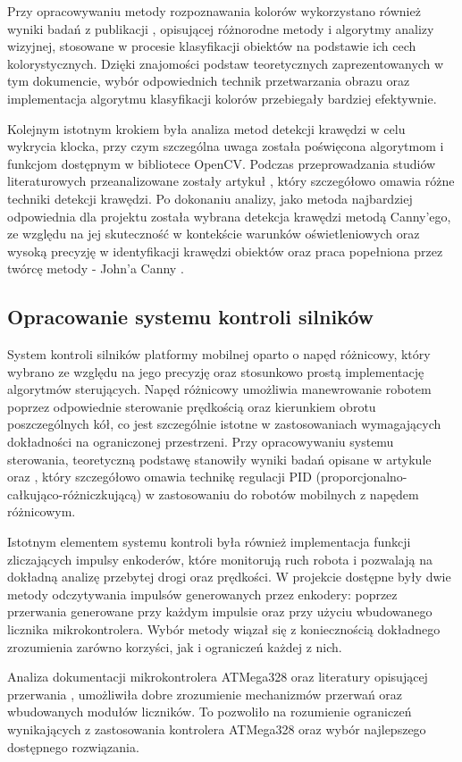 Przy opracowywaniu metody rozpoznawania kolorów wykorzystano również wyniki badań z publikacji \cite{bib:artykul2}, opisującej różnorodne metody i algorytmy analizy wizyjnej, stosowane w procesie klasyfikacji obiektów na podstawie ich cech kolorystycznych. Dzięki znajomości podstaw teoretycznych zaprezentowanych w tym dokumencie, wybór odpowiednich technik przetwarzania obrazu oraz implementacja algorytmu klasyfikacji kolorów przebiegały bardziej efektywnie.

Kolejnym istotnym krokiem była analiza metod detekcji krawędzi w celu wykrycia klocka, przy czym szczególna uwaga została poświęcona algorytmom i funkcjom dostępnym w bibliotece OpenCV. Podczas przeprowadzania studiów literaturowych przeanalizowane zostały artykuł \cite{bib:artykul}, który szczegółowo omawia różne techniki detekcji krawędzi. Po dokonaniu analizy, jako metoda najbardziej odpowiednia dla projektu została wybrana detekcja krawędzi metodą Canny’ego, ze względu na jej skuteczność w kontekście warunków oświetleniowych oraz wysoką precyzję w identyfikacji krawędzi obiektów oraz praca popełniona przez twórcę metody - John'a Canny \cite{bib:canny-article}.


\subsection{Opracowanie systemu kontroli silników}
\label{sec:opracowanie-silnik}
System kontroli silników platformy mobilnej oparto o napęd różnicowy, który wybrano ze względu na jego precyzję oraz stosunkowo prostą implementację algorytmów sterujących. Napęd różnicowy umożliwia manewrowanie robotem poprzez odpowiednie sterowanie prędkością oraz kierunkiem obrotu poszczególnych kół, co jest szczególnie istotne w zastosowaniach wymagających dokładności na ograniczonej przestrzeni. Przy opracowywaniu systemu sterowania, teoretyczną podstawę stanowiły wyniki badań opisane w artykule \cite{bib:konferencja} oraz \cite{bib:encoders-pid}, który szczegółowo omawia technikę regulacji PID (proporcjonalno-całkująco-różniczkującą) w zastosowaniu do robotów mobilnych z napędem różnicowym. 

Istotnym elementem systemu kontroli była również implementacja funkcji zliczających impulsy enkoderów, które monitorują ruch robota i pozwalają na dokładną analizę przebytej drogi oraz prędkości. W projekcie dostępne były dwie metody odczytywania impulsów generowanych przez enkodery: poprzez przerwania generowane przy każdym impulsie oraz przy użyciu wbudowanego licznika mikrokontrolera. Wybór metody wiązał się z koniecznością dokładnego zrozumienia zarówno korzyści, jak i ograniczeń każdej z nich.

Analiza dokumentacji mikrokontrolera ATMega328 \cite{bib:manualarduino} oraz literatury opisującej przerwania \cite{bib:artykul1}, umożliwiła dobre zrozumienie mechanizmów przerwań oraz wbudowanych modułów liczników. To pozwoliło na rozumienie ograniczeń wynikających z zastosowania kontrolera ATMega328 oraz wybór najlepszego dostępnego rozwiązania. 

